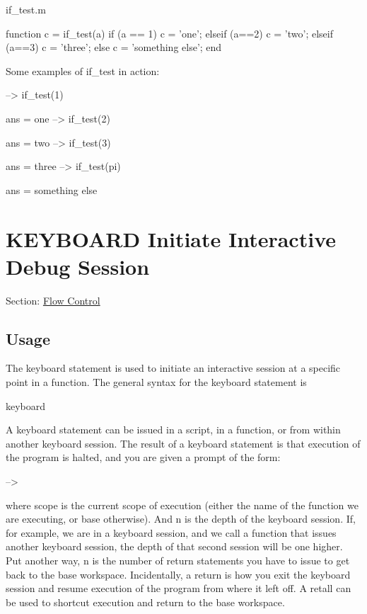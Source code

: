 \begin{DoxyVerb}     if_test.m
\end{DoxyVerb}



\begin{DoxyVerbInclude}
function c = if_test(a)
  if (a == 1)
     c = 'one';
  elseif (a==2)
     c = 'two';
  elseif (a==3)
     c = 'three';
  else
     c = 'something else';
  end
\end{DoxyVerbInclude}


Some examples of {\ttfamily if\-\_\-test} in action\-:


\begin{DoxyVerbInclude}
--> if_test(1)

ans = 
one
--> if_test(2)

ans = 
two
--> if_test(3)

ans = 
three
--> if_test(pi)

ans = 
something else
\end{DoxyVerbInclude}
 \hypertarget{flow_keyboard}{}\section{K\-E\-Y\-B\-O\-A\-R\-D Initiate Interactive Debug Session}\label{flow_keyboard}
Section\-: \hyperlink{sec_flow}{Flow Control} \hypertarget{vtkwidgets_vtkxyplotwidget_Usage}{}\subsection{Usage}\label{vtkwidgets_vtkxyplotwidget_Usage}
The {\ttfamily keyboard} statement is used to initiate an interactive session at a specific point in a function. The general syntax for the {\ttfamily keyboard} statement is \begin{DoxyVerb}   keyboard
\end{DoxyVerb}
 A {\ttfamily keyboard} statement can be issued in a {\ttfamily script}, in a {\ttfamily function}, or from within another {\ttfamily keyboard} session. The result of a {\ttfamily keyboard} statement is that execution of the program is halted, and you are given a prompt of the form\-: \begin{DoxyVerb} [scope,n] -->
\end{DoxyVerb}
 where {\ttfamily scope} is the current scope of execution (either the name of the function we are executing, or {\ttfamily base} otherwise). And {\ttfamily n} is the depth of the {\ttfamily keyboard} session. If, for example, we are in a {\ttfamily keyboard} session, and we call a function that issues another {\ttfamily keyboard} session, the depth of that second session will be one higher. Put another way, {\ttfamily n} is the number of {\ttfamily return} statements you have to issue to get back to the base workspace. Incidentally, a {\ttfamily return} is how you exit the {\ttfamily keyboard} session and resume execution of the program from where it left off. A {\ttfamily retall} can be used to shortcut execution and return to the base workspace.

